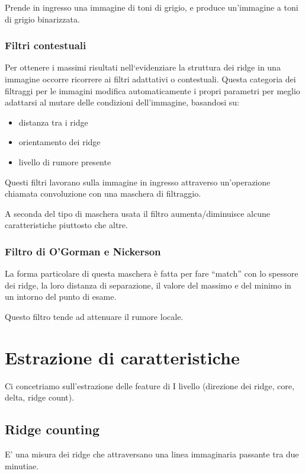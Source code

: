 Prende in ingresso una immagine di toni di grigio, e produce un'immagine 
a toni di grigio binarizzata.

\subsubsection{Filtri contestuali}

Per ottenere i massimi risultati nell‘evidenziare la
struttura dei ridge in una immagine occorre ricorrere ai
filtri adattativi o contestuali. Questa categoria dei filtraggi per le immagini modifica
automaticamente i propri parametri per meglio adattarsi
al mutare delle condizioni dell’immagine, basandosi su:
\begin{itemize}
    \item distanza tra i ridge
    \item orientamento dei ridge
    \item livello di rumore presente
\end{itemize}

Questi filtri lavorano sulla immagine in ingresso
attraverso un’operazione chiamata convoluzione con una
maschera di filtraggio.

A seconda del tipo di maschera usata il filtro
aumenta/diminuisce alcune caratteristiche piuttosto che
altre.

\subsubsection{Filtro di O'Gorman e Nickerson}

La forma particolare di questa maschera è fatta per fare
“match” con lo spessore dei ridge, la loro distanza di
separazione, il valore del massimo e del minimo in un
intorno del punto di esame.

Questo filtro tende ad attenuare il rumore locale.

\section{Estrazione di caratteristiche}

Ci concetriamo sull'estrazione delle feature di I livello (direzione dei ridge, core, delta, ridge count).

\subsection{Ridge counting}

E’ una misura dei ridge che attraversano una
linea immaginaria passante tra due minutiae.

